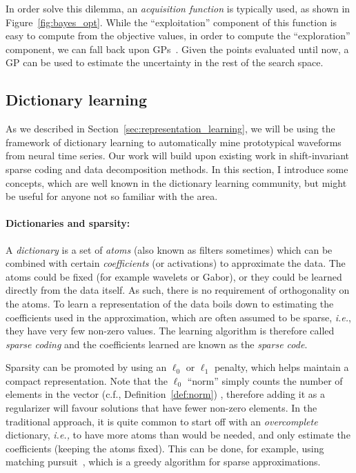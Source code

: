 In order solve this dilemma, an \emph{acquisition function} is typically used, as shown in Figure~\ref{fig:bayes_opt}. While the ``exploitation'' component of this function is easy to compute from the objective values, in order to compute the ``exploration'' component, we can fall back upon \acp{GP}~\citep{rasmussen2004gaussian}. Given the points evaluated until now, a \ac{GP} can be used to estimate the uncertainty in the rest of the search space. 

\subsection{Dictionary learning}
\label{sec:background_dict_learning}

As we described in Section~\ref{sec:representation_learning}, we will be using the framework of dictionary learning to automatically mine prototypical waveforms from neural time series. Our work will build upon existing work in shift-invariant sparse coding and data decomposition methods. In this section, I introduce some concepts, which are well known in the dictionary learning community, but might be useful for anyone not so familiar with the area.

\paragraph{Dictionaries and sparsity:} A \emph{dictionary} is a set of \emph{atoms} (also known as filters sometimes) which can be combined with certain \emph{coefficients} (or activations) to approximate the data. 
The atoms could be fixed (for example wavelets or Gabor), or they could be learned directly from the data itself. As such, there is no requirement of orthogonality on the atoms. 
To learn a representation of the data boils down to estimating the coefficients used in the approximation, which are often assumed to be sparse, \emph{i.e.}, they have very few non-zero values. 
The learning algorithm is therefore called \emph{sparse coding} and the coefficients learned are known as the \emph{sparse code}.

Sparsity can be promoted by using an $\ell_0$ or $\ell_1$ penalty, which helps maintain a compact representation. Note that the $\ell_0$ ``norm'' simply counts the number of elements in the vector (c.f., Definition~\ref{def:norm}) , therefore adding it as a regularizer will favour solutions that have fewer non-zero elements. In the traditional approach, it is quite common to start off with an \emph{overcomplete} dictionary, \emph{i.e.,} to have more atoms than would be needed, and only estimate the coefficients (keeping the atoms fixed). This can be done, for example, using matching pursuit~\citep{mallat1993matching}, which is a greedy algorithm for sparse approximations.

